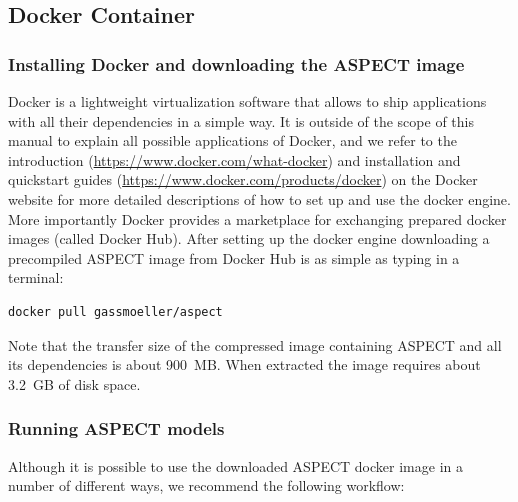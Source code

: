 \documentclass{article}
\newcommand{\aspect}{\textsc{ASPECT}}
\begin{document}
\subsection{Docker Container}
\label{subsec:docker_container}

\subsubsection{Installing Docker and downloading the \aspect{} image}

Docker is a lightweight virtualization software that allows to ship
applications with all their dependencies in a simple way. It is outside of the
scope of this manual to explain all possible applications of Docker, and we
refer to the introduction (\url{https://www.docker.com/what-docker}) and
installation and quickstart guides
(\url{https://www.docker.com/products/docker}) on the Docker website for more
detailed descriptions of how to set up and use the docker engine. More
importantly Docker provides a marketplace for exchanging prepared docker images
(called Docker Hub). After setting up the docker engine downloading a
precompiled \aspect{} image from Docker Hub is as simple as typing in a
terminal:

\begin{lstlisting}[frame=single,language=ksh]
docker pull gassmoeller/aspect
\end{lstlisting}

Note that the transfer size of the compressed image containing \aspect{} and
all its dependencies is about 900~MB. When extracted the image requires about
3.2~GB of disk space.

\subsubsection{Running \aspect{} models}
Although it is possible to use the downloaded \aspect{} docker image in a
number of different ways, we recommend the following workflow:
\end{document}
